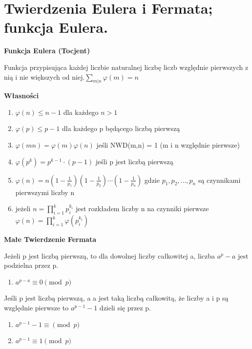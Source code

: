 \documentclass[12pt]{article}
\begin{document}
    \section{Twierdzenia Eulera i Fermata; funkcja Eulera.}
    \begin{definition}
        \textbf{Funkcja Eulera (Tocjent)}
        
         Funkcja przypisująca każdej liczbie naturalnej liczbę liczb względnie pierwszych z nią i nie większych od niej.\newline $\sum_{m|n}^{} \varphi(m) = n$\newline
         
         \textbf{Własności}
         \begin{enumerate}
         \item $\varphi (n) \leq n - 1$  dla każdego $n>1$
         \item $\varphi (p) \leq p - 1$ dla każdego p będącego liczbą pierwszą
         \item $\varphi (mn) = \varphi (m)\varphi(n)$ jeśli NWD(m,n) = 1 (m i n względnie pierwsze)
         \item $\varphi(p^{k}) = p^{k-1} \cdot (p-1)$ jeśli p jest liczbą pierwszą
         \item $\varphi(n) = n  
         \left (  1 - \frac{1}{p_1}\right)
         \left (  1 - \frac{1}{p_2}\right)
         \cdots
         \left (  1 - \frac{1}{p_n}\right)$
         gdzie $p_1, p_2, ..., p_n$ są czynnikami pierwszymi liczby n
         \item jeżeli $n = \prod_{i=1}^{k} p_i^{k_i}$ jest rozkładem liczby n na czynniki pierwsze $\varphi (n) = \prod_{i=1}^{k} \varphi \left( p_i^{k_i} \right )$
         \end{enumerate}
    \end{definition}
    
    \begin{definition}
    \textbf{Małe Twierdzenie Fermata}
    
    Jeżeli p jest liczbą pierwszą, to dla dowolnej liczby całkowitej a, liczba $a^{p}-a$ jest podzielna przez p.\newline 
    \begin{enumerate}
    \item $a^{p-a} \equiv 0 \pmod p$\newline
    \end{enumerate}
    
    Jeśli p jest liczbą pierwszą, a a jest taką liczbą całkowitą, że liczby a i p są względnie pierwsze to $a^{p-1} - 1$ dzieli się przez p.\newline
    
    \begin{enumerate}
    \item$a^{p-1} - 1 \equiv \pmod p$
    \item$a^{p-1} \equiv 1 \pmod p$
    \end{enumerate}

    \end{definition}
    
\end{document}
